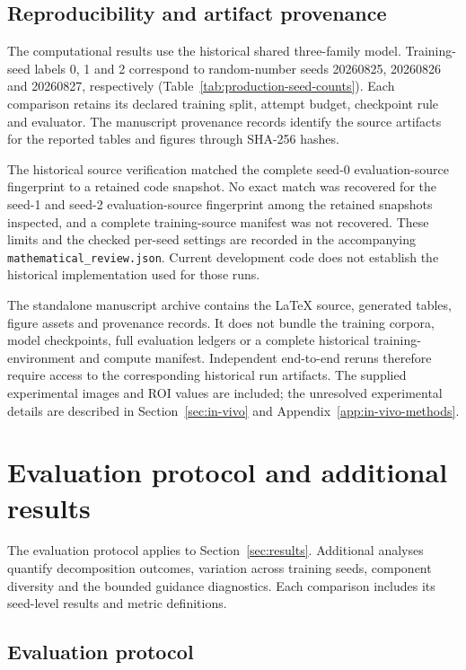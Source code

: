 \documentclass{article}
\theoremstyle{definition}
\begin{document}
\subsection{Reproducibility and artifact provenance}
\label{app:repro}

The computational results use the historical shared three-family model. Training-seed labels
0, 1 and 2 correspond to random-number seeds 20260825, 20260826 and 20260827, respectively
(Table~\ref{tab:production-seed-counts}). Each comparison retains its declared training split,
attempt budget, checkpoint rule and evaluator. The manuscript provenance records identify the
source artifacts for the reported tables and figures through SHA-256 hashes.

The historical source verification matched the complete seed-0 evaluation-source fingerprint to
a retained code snapshot. No exact match was recovered for the seed-1 and seed-2 evaluation-source
fingerprint among the retained snapshots inspected, and a complete training-source manifest was
not recovered. These limits and the checked per-seed settings are recorded in the accompanying
\nolinkurl{mathematical_review.json}. Current development code does not establish the historical
implementation used for those runs.

The standalone manuscript archive contains the LaTeX source, generated tables, figure assets and
provenance records. It does not bundle the training corpora, model checkpoints, full evaluation
ledgers or a complete historical training-environment and compute manifest. Independent end-to-end
reruns therefore require access to the corresponding historical run artifacts. The supplied
experimental images and ROI values are included; the unresolved experimental details are described
in Section~\ref{sec:in-vivo} and Appendix~\ref{app:in-vivo-methods}.

\clearpage

\section{Evaluation protocol and additional results}
\label{app:results}

The evaluation protocol applies to Section~\ref{sec:results}. Additional analyses quantify
decomposition outcomes, variation across training seeds, component diversity and the bounded guidance
diagnostics. Each comparison includes its seed-level results and metric definitions.

\FloatBarrier
\subsection{Evaluation protocol}
\label{app:evaluation-protocol}
\end{document}
